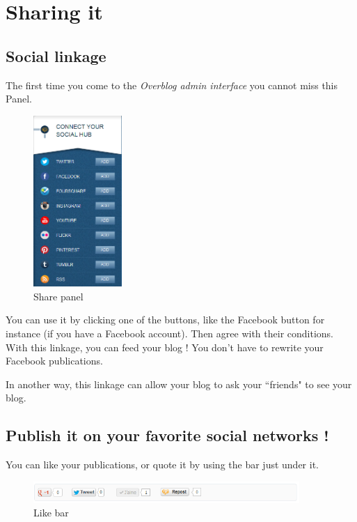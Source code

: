 \documentclass[a4paper,10pt]{article}
\begin{document}
\newpage
\section{Sharing it}

\subsection{Social linkage}

The first time you come to the  \emph{Overblog admin interface} you cannot miss this Panel.
\begin{figure}[h]
    \center
  \includegraphics[width=0.3\textwidth]{Images/shareIni.png}
    \caption{Share panel}
\end{figure}

You can use it by clicking one of the buttons, like the Facebook button for instance (if you have a Facebook account). Then agree with their conditions. With this linkage, you can feed your blog ! You don't have to rewrite your Facebook publications.

In another way, this linkage can allow your blog to ask your ``friends" to see your blog.

\subsection{Publish it on your favorite social networks !}

You can like your publications, or quote it by using the bar just under it.

\begin{figure}[h]
    \center
  \includegraphics[width=0.9\textwidth]{Images/articleBar.png}
    \caption{Like bar}
\end{figure}
\end{document}
